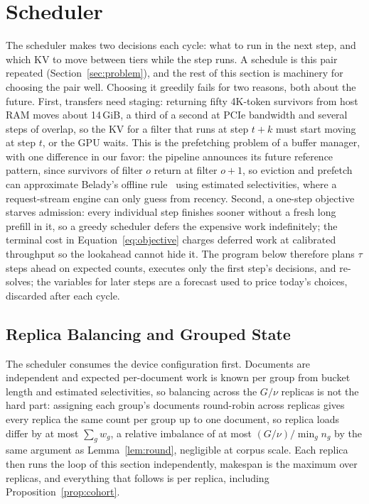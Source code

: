 \documentclass[10pt,twocolumn]{article}
\begin{document}
\section{Scheduler}
\label{sec:sched}

The scheduler makes two decisions each cycle: what to run in the next step, and which KV to move between tiers while the step runs. A schedule is this pair repeated (Section~\ref{sec:problem}), and the rest of this section is machinery for choosing the pair well. Choosing it greedily fails for two reasons, both about the future. First, transfers need staging: returning fifty 4K-token survivors from host RAM moves about 14\,GiB, a third of a second at PCIe bandwidth and several steps of overlap, so the KV for a filter that runs at step $t{+}k$ must start moving at step $t$, or the GPU waits. This is the prefetching problem of a buffer manager, with one difference in our favor: the pipeline announces its future reference pattern, since survivors of filter $o$ return at filter $o{+}1$, so eviction and prefetch can approximate Belady's offline rule~\cite{belady} using estimated selectivities, where a request-stream engine can only guess from recency. Second, a one-step objective starves admission: every individual step finishes sooner without a fresh long prefill in it, so a greedy scheduler defers the expensive work indefinitely; the terminal cost in Equation~\eqref{eq:objective} charges deferred work at calibrated throughput so the lookahead cannot hide it. The program below therefore plans $\tau$ steps ahead on expected counts, executes only the first step's decisions, and re-solves; the variables for later steps are a forecast used to price today's choices, discarded after each cycle.

\subsection{Replica Balancing and Grouped State}

The scheduler consumes the device configuration first. Documents are independent and expected per-document work is known per group from bucket length and estimated selectivities, so balancing across the $G/\nu$ replicas is not the hard part: assigning each group's documents round-robin across replicas gives every replica the same count per group up to one document, so replica loads differ by at most $\sum_g w_g$, a relative imbalance of at most $(G/\nu)/\min_g n_g$ by the same argument as Lemma~\ref{lem:round}, negligible at corpus scale. Each replica then runs the loop of this section independently, makespan is the maximum over replicas, and everything that follows is per replica, including Proposition~\ref{prop:cohort}.
\end{document}
